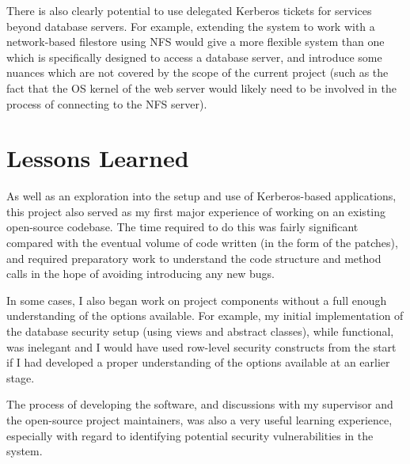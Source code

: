 \documentclass[12pt]{report}
\begin{document}
There is also clearly potential to use delegated Kerberos tickets for services beyond database servers. For example, extending the system to work with a network-based filestore using NFS would give a more flexible system than one which is specifically designed to access a database server, and introduce some nuances which are not covered by the scope of the current project (such as the fact that the OS kernel of the web server would likely need to be involved in the process of connecting to the NFS server).

\section{Lessons Learned}
As well as an exploration into the setup and use of Kerberos-based applications, this project also served as my first major experience of working on an existing open-source codebase. The time required to do this was fairly significant compared with the eventual volume of code written (in the form of the patches), and required preparatory work to understand the code structure and method calls in the hope of avoiding introducing any new bugs.

In some cases, I also began work on project components without a full enough understanding of the options available. For example, my initial implementation of the database security setup (using views and abstract classes), while functional, was inelegant and I would have used row-level security constructs from the start if I had developed a proper understanding of the options available at an earlier stage.

The process of developing the software, and discussions with my supervisor and the open-source project maintainers, was also a very useful learning experience, especially with regard to identifying potential security vulnerabilities in the system.
\end{document}
